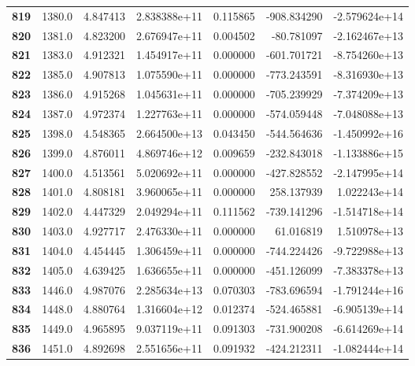 \documentclass{report}[12pt]
\begin{document}
\begin{center}
\begin{tabular}{lrrrrrr}
\textbf{819 } &         1380.0 &   4.847413 &  2.838388e+11 &    0.115865 &  -908.834290 & -2.579624e+14 \\
\textbf{820 } &         1381.0 &   4.823200 &  2.676947e+11 &    0.004502 &   -80.781097 & -2.162467e+13 \\
\textbf{821 } &         1383.0 &   4.912321 &  1.454917e+11 &    0.000000 &  -601.701721 & -8.754260e+13 \\
\textbf{822 } &         1385.0 &   4.907813 &  1.075590e+11 &    0.000000 &  -773.243591 & -8.316930e+13 \\
\textbf{823 } &         1386.0 &   4.915268 &  1.045631e+11 &    0.000000 &  -705.239929 & -7.374209e+13 \\
\textbf{824 } &         1387.0 &   4.972374 &  1.227763e+11 &    0.000000 &  -574.059448 & -7.048088e+13 \\
\textbf{825 } &         1398.0 &   4.548365 &  2.664500e+13 &    0.043450 &  -544.564636 & -1.450992e+16 \\
\textbf{826 } &         1399.0 &   4.876011 &  4.869746e+12 &    0.009659 &  -232.843018 & -1.133886e+15 \\
\textbf{827 } &         1400.0 &   4.513561 &  5.020692e+11 &    0.000000 &  -427.828552 & -2.147995e+14 \\
\textbf{828 } &         1401.0 &   4.808181 &  3.960065e+11 &    0.000000 &   258.137939 &  1.022243e+14 \\
\textbf{829 } &         1402.0 &   4.447329 &  2.049294e+11 &    0.111562 &  -739.141296 & -1.514718e+14 \\
\textbf{830 } &         1403.0 &   4.927717 &  2.476330e+11 &    0.000000 &    61.016819 &  1.510978e+13 \\
\textbf{831 } &         1404.0 &   4.454445 &  1.306459e+11 &    0.000000 &  -744.224426 & -9.722988e+13 \\
\textbf{832 } &         1405.0 &   4.639425 &  1.636655e+11 &    0.000000 &  -451.126099 & -7.383378e+13 \\
\textbf{833 } &         1446.0 &   4.987076 &  2.285634e+13 &    0.070303 &  -783.696594 & -1.791244e+16 \\
\textbf{834 } &         1448.0 &   4.880764 &  1.316604e+12 &    0.012374 &  -524.465881 & -6.905139e+14 \\
\textbf{835 } &         1449.0 &   4.965895 &  9.037119e+11 &    0.091303 &  -731.900208 & -6.614269e+14 \\
\textbf{836 } &         1451.0 &   4.892698 &  2.551656e+11 &    0.091932 &  -424.212311 & -1.082444e+14 \\

\end{tabular}
\end{center}
\end{document}
